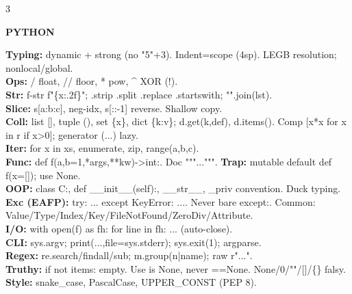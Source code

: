 \documentclass[10pt,letterpaper]{article}
\newenvironment{topic}[1]{%
  \par\addvspace{1.5pt}%
  \noindent\colorbox{hdrBG}{%
    \begin{minipage}{\dimexpr\linewidth-2\fboxsep\relax}%
      \centering\bfseries\sffamily\fontsize{6pt}{7pt}\selectfont\color{hdrFG}\MakeUppercase{#1}%
    \end{minipage}%
  }\par\nobreak\vskip0.5pt%
  \begingroup\setlength{\leftskip}{0pt}\setlength{\rightskip}{0pt}%
}{%
  \endgroup\par\addvspace{0.5pt}%
}
\newcommand{\warn}[1]{\textcolor{warnC}{\textbf{#1}}}
\newcommand{\hd}[1]{\textcolor{accent}{\textbf{#1}}}
\newcommand{\cn}[1]{{\ttfamily\small #1}}
\begin{document}
\begin{multicols*}{3}
\begin{topic}{Python}
\hd{Typing:} dynamic + strong (no \cn{"5"+3}). Indent=scope (4sp). LEGB resolution; \cn{nonlocal}/\cn{global}.\\
\hd{Ops:} \cn{/} float, \cn{//} floor, \cn{**} pow, \cn{\textasciicircum} XOR (!).\\
\hd{Str:} f-str \cn{f"\{x:.2f\}"}; \cn{.strip .split .replace .startswith}; \cn{"".join(lst)}.\\
\hd{Slice:} \cn{s[a:b:c]}, neg-idx, \cn{s[::-1]} reverse. Shallow copy.\\
\hd{Coll:} list \cn{[]}, tuple \cn{()}, set \cn{\{x\}}, dict \cn{\{k:v\}}; \cn{d.get(k,def)}, \cn{d.items()}. Comp \cn{[x*x for x in r if x>0]}; generator \cn{(...)} lazy.\\
\hd{Iter:} \cn{for x in xs}, \cn{enumerate}, \cn{zip}, \cn{range(a,b,c)}.\\
\hd{Func:} \cn{def f(a,b=1,*args,**kw)->int:}. Doc \cn{"""..."""}. \warn{Trap:} mutable default \cn{def f(x=[])}; use \cn{None}.\\
\hd{OOP:} \cn{class C:}, \cn{def \_\_init\_\_(self):}, \cn{\_\_str\_\_}, \cn{\_priv} convention. Duck typing.\\
\hd{Exc (EAFP):} \cn{try: ... except KeyError: ...}. Never bare \cn{except:}. Common: \cn{Value/Type/Index/Key/FileNotFound/ZeroDiv/Attribute}.\\
\hd{I/O:} \cn{with open(f) as fh: for line in fh: ...} (auto-close).\\
\hd{CLI:} \cn{sys.argv}; \cn{print(...,file=sys.stderr)}; \cn{sys.exit(1)}; \cn{argparse}.\\
\hd{Regex:} \cn{re.search/findall/sub}; \cn{m.group(n|name)}; raw \cn{r"..."}.\\
\hd{Truthy:} \cn{if not items:} empty. Use \cn{is None}, never \cn{==None}. \cn{None/0/""/[]/\{\}} falsy.\\
\hd{Style:} snake\_case, PascalCase, UPPER\_CONST (PEP 8).
\end{topic}


\end{multicols*}
\end{document}
